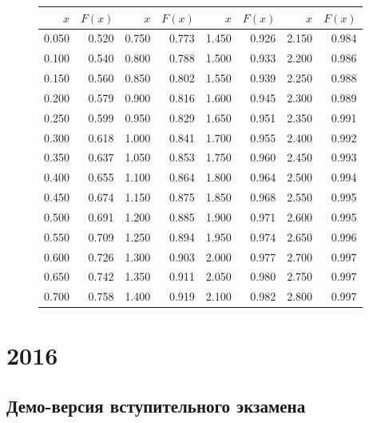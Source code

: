 \documentclass[addpoints, answers]{exam} %
\begin{document}
\begin{figure}[b]
\begin{minipage}[b]{0.35\linewidth}
\begin{tikzpicture}
\end{tikzpicture}
\par\vspace{0pt}
  \end{minipage}%
  \begin{minipage}[b]{0.60\linewidth}
    \centering
\begin{tabular}{rr|rr|rr|rr}
  \hline
$x$ & $F(x)$ & $x$ & $F(x)$ & $x$ & $F(x)$ & $x$ & $F(x)$ \\
  \hline
0.050 & 0.520 & 0.750 & 0.773 & 1.450 & 0.926 & 2.150 & 0.984 \\
  0.100 & 0.540 & 0.800 & 0.788 & 1.500 & 0.933 & 2.200 & 0.986 \\
  0.150 & 0.560 & 0.850 & 0.802 & 1.550 & 0.939 & 2.250 & 0.988 \\
  0.200 & 0.579 & 0.900 & 0.816 & 1.600 & 0.945 & 2.300 & 0.989 \\
  0.250 & 0.599 & 0.950 & 0.829 & 1.650 & 0.951 & 2.350 & 0.991 \\
  0.300 & 0.618 & 1.000 & 0.841 & 1.700 & 0.955 & 2.400 & 0.992 \\
  0.350 & 0.637 & 1.050 & 0.853 & 1.750 & 0.960 & 2.450 & 0.993 \\
  0.400 & 0.655 & 1.100 & 0.864 & 1.800 & 0.964 & 2.500 & 0.994 \\
  0.450 & 0.674 & 1.150 & 0.875 & 1.850 & 0.968 & 2.550 & 0.995 \\
  0.500 & 0.691 & 1.200 & 0.885 & 1.900 & 0.971 & 2.600 & 0.995 \\
  0.550 & 0.709 & 1.250 & 0.894 & 1.950 & 0.974 & 2.650 & 0.996 \\
  0.600 & 0.726 & 1.300 & 0.903 & 2.000 & 0.977 & 2.700 & 0.997 \\
  0.650 & 0.742 & 1.350 & 0.911 & 2.050 & 0.980 & 2.750 & 0.997 \\
  0.700 & 0.758 & 1.400 & 0.919 & 2.100 & 0.982 & 2.800 & 0.997 \\
   \hline
\end{tabular}
\par\vspace{0pt}
\end{minipage}
\label{fig:test}
\end{figure}

\newpage
\section{2016}

\subsection{Демо-версия вступительного экзамена}
\end{document}
